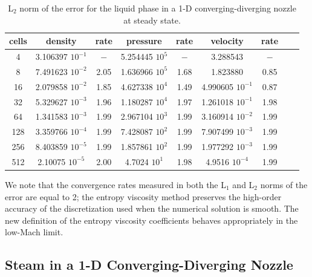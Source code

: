 \documentclass[review,10pt]{elsarticle}
\begin{document}
\begin{table}[H]
\begin{center}
 \caption{\label{tbl:l2_norm_liq} L$_2$ norm of the error for the liquid phase in a 1-D converging-diverging nozzle at steady state.}
 \begin{tabular}{|c|c|c|c|c|c|c|c|c|}
 \hline
cells& density            & rate & pressure          & rate & velocity           & rate \\ \hline
4    & 3.106397 $10^{-1}$ & $-$  & 5.254445 $10^{5}$ & $-$  & 3.288543           & $-$  \\ \hline
8    & 7.491623 $10^{-2}$ & 2.05 & 1.636966 $10^{5}$ & 1.68 & 1.823880           & 0.85 \\ \hline
16   & 2.079858 $10^{-2}$ & 1.85 & 4.627338 $10^{4}$ & 1.49 & 4.990605 $10^{-1}$ & 0.87 \\ \hline
32   & 5.329627 $10^{-3}$ & 1.96 & 1.180287 $10^{4}$ & 1.97 & 1.261018 $10^{-1}$ & 1.98 \\ \hline
64   & 1.341583 $10^{-3}$ & 1.99 & 2.967104 $10^{3}$ & 1.99 & 3.160914 $10^{-2}$ & 1.99 \\ \hline
128  & 3.359766 $10^{-4}$ & 1.99 & 7.428087 $10^{2}$ & 1.99 & 7.907499 $10^{-3}$ & 1.99 \\ \hline
256  & 8.403859 $10^{-5}$ & 1.99 & 1.857861 $10^{2}$ & 1.99 & 1.977292 $10^{-3}$ & 1.99 \\ \hline
512  & 2.10075  $10^{-5}$ & 2.00 & 4.7024   $10^{1}$ & 1.98 & 4.9516   $10^{-4}$ & 1.99 \\ \hline
\end{tabular}
\end{center}
\end{table}
We note that the convergence rates measured in both the L$_1$ and L$_2$ norms of the error are equal to 2; the entropy viscosity method preserves 
the high-order accuracy of the discretization used when the numerical solution is smooth. The new definition of the entropy viscosity coefficients behaves 
appropriately in the low-Mach limit.

\subsection{Steam in a 1-D Converging-Diverging Nozzle} \label{sec:steam_nozzle}
\end{document}
